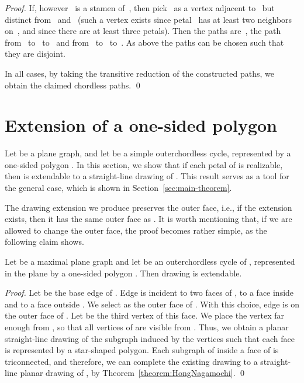 \documentclass{llncs}
\begin{document}
\begin{proof}
  If, however~ is a stamen of~, then pick~ as a vertex
  adjacent to~ but distinct from~ and~ (such a vertex exists
  since petal~ has at least two neighbors on~, and since there
  are at least three petals).  Then the paths are~, the path
  from~ to~ to~ and from~ to~ to~.  As above the
  paths can be chosen such that they are disjoint.

  In all cases, by taking the transitive reduction of the constructed
  paths, we obtain the claimed chordless paths.
\qed
\end{proof}




\section{Extension of a one-sided polygon}
\label{sec:extension-one-sided}

Let  be a plane graph, and let  be a simple outerchordless cycle, represented by a one-sided polygon . In this section, we show that if each petal of  is realizable, then  
is extendable to a straight-line drawing of . This result serves as a tool for the general case, which is shown in Section~\ref{sec:main-theorem}.

The drawing extension we produce preserves the outer face, i.e., if the extension exists, then it has the same outer
face as . It is worth mentioning that, if we are allowed to change the outer face, the proof becomes rather simple, as the following claim shows.

\begin{remark} 
\label{theor:one-sided-nochange} Let  be a maximal plane graph and let  be an outerchordless cycle of , represented in the plane by a one-sided polygon . Then drawing  is extendable.
\end{remark}
\begin{proof}
Let  be the base edge of .
Edge  is incident to two faces of , to a face  inside  and to a face  outside . 
We select  as the
outer face of . With this choice, edge
 is on the outer face of . Let  be the third vertex of this face. 
We place the vertex  far enough from , so that all vertices of  are visible from . Thus, we obtain a planar straight-line drawing of the subgraph  induced by the
vertices  such that each face is represented by a star-shaped polygon. Each subgraph of  inside a face of  is triconnected, and therefore, we can complete the existing drawing to a straight-line planar drawing of , by Theorem~\ref{theorem:HongNagamochi}. \qed
\end{proof}
\end{document}
